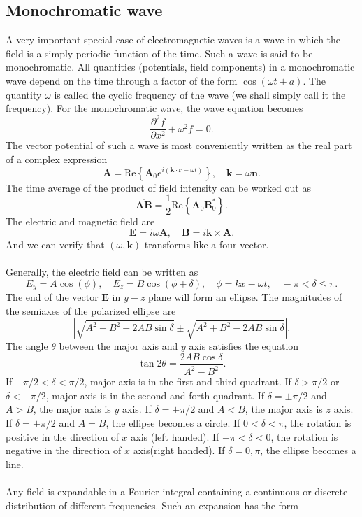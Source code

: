 \subsection{Monochromatic wave}
A very important special case of electromagnetic waves is a wave in which the field is a simply periodic function of the time. Such a wave is said to be monochromatic. All quantities
(potentials, field components) in a monochromatic wave depend on the time through a factor of the form $\cos(\omega t + a)$. The quantity $\omega$ is called the cyclic frequency of the wave (we shall simply call it the frequency). For the monochromatic wave, the wave equation becomes
\[\frac{\partial^2 f}{\partial x^2} +	 \omega^2 f = 0.\]
The vector potential of such a wave is most conveniently written as the real part of a complex expression
\[\bm{A} = \mathrm{Re}\left\{ \bm{A}_0 e^{i(\bm{k}\cdot\bm{r}-\omega t)}\right\} , \quad \bm{k} = \omega \bm{n}.\]
The time average of the product of field intensity can be worked out as
\[\overline{\bm{A}\bm{B}} = \frac{1}{2}\mathrm{Re}\left\{ \bm{A}_0 \bm{B}_0^*\right\}.\]
The electric and magnetic field are
\[\bm{E} = i\omega \bm{A} , \quad \bm{B} = i\bm{k}\times\bm{A}.\]
And we can verify that $(\omega,\bm{k})$ transforms like a four-vector.
\\ \\
Generally, the electric field can be  written as
\[E_y = A\cos(\phi) , \quad E_z = B\cos(\phi + \delta) , \quad \phi= kx -\omega t   , \quad -\pi < \delta \leq \pi.\]
The end of the vector $\bm{E}$ in $y-z$ plane will form an ellipse. The magnitudes of the semiaxes of the polarized ellipse are
\[|\sqrt{A^2+B^2+2AB\sin\delta} \pm \sqrt{A^2+B^2-2AB\sin\delta}|.\]
The angle $\theta$ between the major axis and $y$ axis satisfies the equation
\[\tan 2\theta = \frac{2AB\cos\delta}{A^2-B^2}.\]
If $-{\pi}/{2} < \delta < {\pi}/{2}$, major axis is in the first and third quadrant. If $\delta > {\pi}/{2}$ or $\delta < -{\pi}/{2}$, major axis is in the second and forth quadrant. If $\delta = \pm {\pi}/{2}$ and $A>B$, the major axis is $y$ axis. If $\delta = \pm {\pi}/{2}$ and $A<B$, the major axis is $z$ axis. If $\delta = \pm {\pi}/{2}$ and $A=B$, the ellipse becomes a circle.
If $0 < \delta < \pi$, the rotation is positive in the direction of $x$ axis (left handed). If $-\pi < \delta < 0$, the rotation is negative in the direction of $x$ axis(right handed). If $\delta = 0,\pi$, the ellipse becomes a line.
\\ \\
Any field is expandable in a Fourier integral containing a continuous or discrete distribution of different frequencies. Such an expansion has the form
